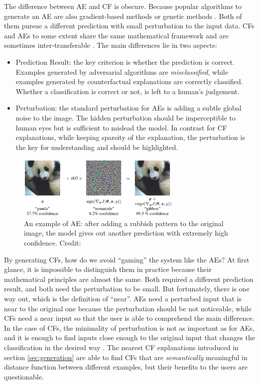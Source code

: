 The difference between AE and CF is obscure. Because popular algorithms to generate an AE are also gradient-based methods or genetic methods \cite{AEoverview}. Both of them pursue a different prediction with small perturbation to the input data. CFs and AEs to some extent share the same mathematical framework and are sometimes inter-transferable \cite{CFandAE}. The main differences lie in two aspects:
\begin{itemize}
  \item Prediction Result: the key criterion is whether the prediction is correct. Examples generated by adversarial algorithms are \emph{misclassified}, while examples generated by counterfactual explanations are correctly classified. Whether a classification is correct or not, is left to a human's judgement.
  \item Perturbation: the standard perturbation for AEs is adding a subtle global noise to the image. The hidden perturbation should be imperceptible to human eyes but is sufficient to mislead the model. In contrast for CF explanations, while keeping sparsity of the explanation, the perturbation is the key for understanding and should be highlighted.  %
\end{itemize}
\begin{figure}
  \centering
  \includegraphics[width=0.7\textwidth]{adversarial.PNG}
  \caption{An example of AE: after adding a rubbish pattern to the original image, the model gives out another prediction with extremely high confidence. Credit: \cite{goodfellow2014explaining}}
  \label{fig:AE}
\end{figure}

By generating CFs, how do we avoid  ``gaming'' the system like the AEs? At first glance, it is impossible to distinguish them in practice because their mathematical principles are almost the same. Both required a different prediction result, and both need the perturbation to be small. But fortunately, there is one way out, which is the definition of ``near''. AEs need a perturbed input that is near to the original one because the perturbation should be not noticeable, while CFs need a near input so that the user is able to comprehend the main difference. In the case of CFs, the minimality of perturbation is not as important as for AEs, and it is enough to find inputs close enough to the original input that changes the classification in the desired way \cite{CFandAE}. The nearest CF explanations introduced in section \ref{sec:generation} are able to find CFs that are \emph{semantically} meaningful in distance function between different examples, but their benefits to the users are questionable.

